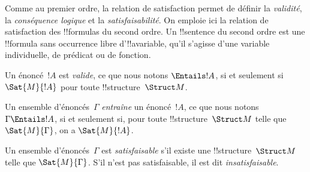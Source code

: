 \documentclass[../../../include/open-logic-section]{subfiles}
\begin{document}

\begin{explain}
Comme au premier ordre, la relation de satisfaction permet de définir
la \emph{validité}, la \emph{conséquence logique} et la
\emph{satisfaisabilité}. On emploie ici la relation de satisfaction
des !!{formula}s du second ordre. Un !!{sentence} du second ordre
est une !!{formula} sans occurrence libre d'!!a{variable}, qu'il
s'agisse d'une variable individuelle, de prédicat ou de fonction.
\end{explain}

\begin{defn}[Validité]
Un énoncé~$!A$ est \emph{valide}, ce que nous
notons $\Entails !A$, si et seulement si
$\Sat{M}{!A}$ pour toute
!!{structure}~$\Struct M$.
\end{defn}

\begin{defn}
Un ensemble d'énoncés~$\Gamma$ \emph{entraîne}
un énoncé~$!A$, ce que nous notons
$\Gamma\Entails !A$, si et seulement si,
pour toute !!{structure}~$\Struct M$ telle que
$\Sat{M}{\Gamma}$, on a $\Sat{M}{!A}$.
\end{defn}

\begin{defn}[Satisfaisabilité]
Un ensemble d'énoncés~$\Gamma$ est
\emph{satisfaisable} s'il existe une
!!{structure}~$\Struct M$ telle que
$\Sat{M}{\Gamma}$. S'il n'est pas satisfaisable,
il est dit \emph{insatisfaisable}.
\end{defn}
\end{document}
